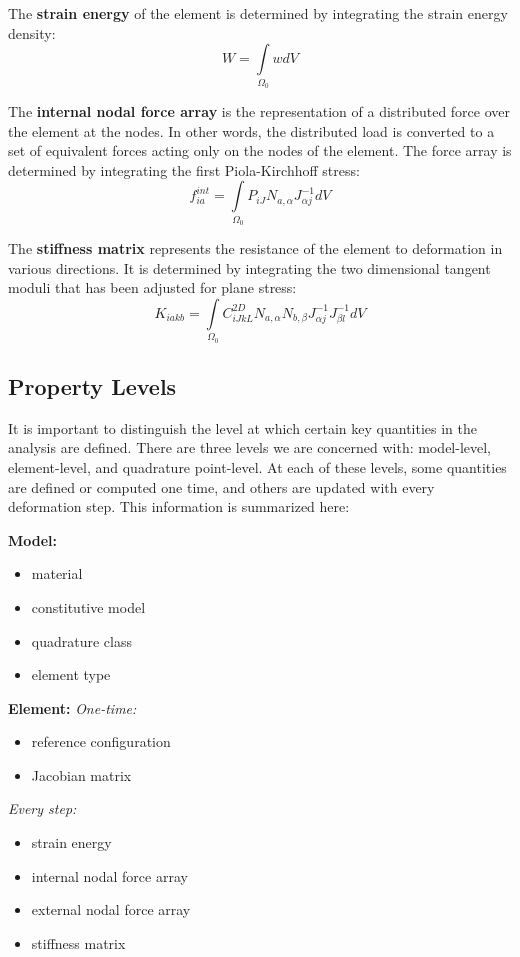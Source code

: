 \documentclass[]{spie}  %
\begin{document}
The \textbf{strain energy} of the element is determined by integrating the strain energy density:
\begin{equation}
\label{eq: strain energy}
W = \int\limits_{\Omega_0} w dV
\end{equation}

The \textbf{internal nodal force array} is the representation of a distributed force over the element at the nodes. In other words, the distributed load is converted to a set of equivalent forces acting only on the nodes of the element. The force array is determined by integrating the first Piola-Kirchhoff stress:
\begin{equation}
\label{eq: internal nodal force array}
f_{ia}^{int} = \int\limits_{\Omega_0} P_{iJ} N_{a,\alpha} J_{\alpha j}^{-1} dV
\end{equation}

The \textbf{stiffness matrix} represents the resistance of the element to deformation in various directions. It is determined by integrating the two dimensional tangent moduli that has been adjusted for plane stress:
\begin{equation}
\label{eq: stiffness matrix}
K_{iakb} = \int\limits_{\Omega_0} C_{iJkL}^{2D} N_{a,\alpha} N_{b,\beta} J_{\alpha j}^{-1} J_{\beta l}^{-1} dV
\end{equation}

\subsection{Property Levels}
\label{sec: property levels}
It is important to distinguish the level at which certain key quantities in the analysis are defined. There are three levels we are concerned with: model-level, element-level, and quadrature point-level. At each of these levels, some quantities are defined or computed one time, and others are updated with every deformation step. This information is summarized here:

\noindent
\textbf{Model:}
\begin{itemize}
	\item material
	\item constitutive model
	\item quadrature class
	\item element type
\end{itemize}

\noindent
\textbf{Element:} \smallbreak
\indent \textit{One-time:}
\begin{itemize}
	\item reference configuration
	\item Jacobian matrix
\end{itemize}
\smallbreak \textit{Every step:}
\begin{itemize}
	\item strain energy
	\item internal nodal force array
	\item external nodal force array
	\item stiffness matrix
\end{itemize}
\end{document}
